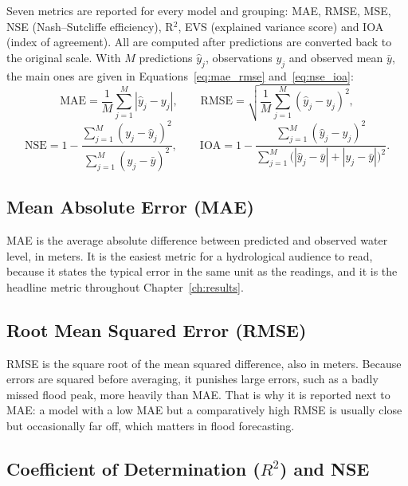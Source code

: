 Seven metrics are reported for every model and grouping: MAE, RMSE, MSE, NSE
(Nash--Sutcliffe efficiency), R$^2$, EVS (explained variance score) and IOA
(index of agreement). All are computed after predictions are converted back to
the original scale. With $M$ predictions $\hat{y}_j$, observations $y_j$ and
observed mean $\bar{y}$, the main ones are given in
Equations~\eqref{eq:mae_rmse} and~\eqref{eq:nse_ioa}:
\begin{equation}
  \mathrm{MAE} = \frac{1}{M}\sum_{j=1}^{M}|\hat{y}_j - y_j|, \qquad
  \mathrm{RMSE} = \sqrt{\frac{1}{M}\sum_{j=1}^{M}(\hat{y}_j - y_j)^2},
  \label{eq:mae_rmse}
\end{equation}
\begin{equation}
  \mathrm{NSE} = 1 - \frac{\sum_{j=1}^{M}(y_j - \hat{y}_j)^2}{\sum_{j=1}^{M}(y_j - \bar{y})^2}, \qquad
  \mathrm{IOA} = 1 - \frac{\sum_{j=1}^{M}(\hat{y}_j - y_j)^2}{\sum_{j=1}^{M}\big(|\hat{y}_j - \bar{y}| + |y_j - \bar{y}|\big)^2}.
  \label{eq:nse_ioa}
\end{equation}

\subsection{Mean Absolute Error (MAE)}
\label{sec:3.16.1}

MAE is the average absolute difference between predicted and observed water
level, in meters. It is the easiest metric for a hydrological audience to read,
because it states the typical error in the same unit as the readings, and it is
the headline metric throughout Chapter~\ref{ch:results}.

\subsection{Root Mean Squared Error (RMSE)}
\label{sec:3.16.2}

RMSE is the square root of the mean squared difference, also in meters. Because
errors are squared before averaging, it punishes large errors, such as a badly
missed flood peak, more heavily than MAE. That is why it is reported next to
MAE: a model with a low MAE but a comparatively high RMSE is usually close but
occasionally far off, which matters in flood forecasting.

\subsection{Coefficient of Determination ($R^2$) and NSE}
\label{sec:3.16.3}

